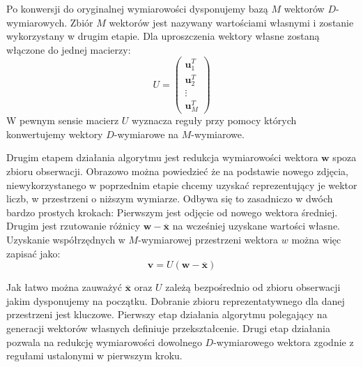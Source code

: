 \documentclass[oneside, eng]{mgr}
\newcommand{\bb}{\textbf}
\begin{document}
Po konwersji do oryginalnej wymiarowości dysponujemy bazą $M$ wektorów $D$-wymiarowych. Zbiór $M$ wektorów jest nazywany wartościami własnymi i zostanie wykorzystany w drugim etapie. Dla uproszczenia wektory własne zostaną włączone do jednej macierzy:
\begin{equation}
	U = 
	\left( \begin{array}{l}
		\bb{u}_1^T \\
		\bb{u}_2^T \\
		\vdots	 \\
		\bb{u}_M^T
	\end{array} \right)
\end{equation}
W pewnym sensie macierz $U$ wyznacza reguły przy pomocy których konwertujemy wektory $D$-wymiarowe na $M$-wymiarowe.

Drugim etapem działania algorytmu jest redukcja wymiarowości wektora $\bb{w}$ spoza zbioru obserwacji. Obrazowo można powiedzieć że na podstawie nowego zdjęcia, niewykorzystanego w poprzednim etapie chcemy uzyskać reprezentujący je wektor liczb, w przestrzeni o niższym wymiarze. Odbywa się to zasadniczo w dwóch bardzo prostych krokach: Pierwszym jest odjęcie od nowego wektora średniej. Drugim jest rzutowanie różnicy $\bb{w} - \overline{\bb{x}}$ na wcześniej uzyskane wartości własne. Uzyskanie współrzędnych w $M$-wymiarowej przestrzeni wektora $w$ można więc zapisać jako:
\begin{equation}
	\bb{v} = U ( \bb{w} - \overline{\bb{x}} ) 
\end{equation}

Jak łatwo można zauważyć $\overline{\bb{x}}$ oraz $U$ zależą bezpośrednio od zbioru obserwacji jakim dysponujemy na początku. Dobranie zbioru reprezentatywnego dla danej przestrzeni jest kluczowe. Pierwszy etap działania algorytmu polegający na generacji wektorów własnych definiuje przekształcenie. Drugi etap działania pozwala na redukcję wymiarowości dowolnego $D$-wymiarowego wektora zgodnie z regułami ustalonymi w pierwszym kroku.
\end{document}
